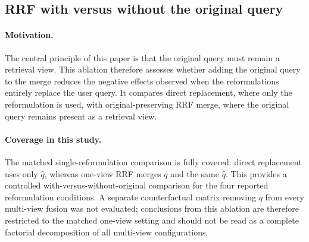 \documentclass[a4paper,fleqn]{cas-dc}
\begin{document}
\subsection{RRF with versus without the original query}
\label{sec:ablation-original}
\paragraph{Motivation.}
The central principle of this paper is that the
original query must remain a retrieval view. This
ablation therefore assesses whether adding the original query
to the merge reduces the negative effects observed
when the reformulations entirely replace the
user query. It compares direct replacement,
where only the reformulation is used, with
original-preserving RRF merge, where the original query
remains present as a retrieval view.
\paragraph{Coverage in this study.}
The matched single-reformulation comparison is fully covered:
direct replacement uses only $\hat{q}$, whereas one-view RRF merges
$q$ and the same $\hat{q}$. This provides a controlled
with-versus-without-original comparison for the four reported
reformulation conditions. A separate counterfactual matrix removing
$q$ from every multi-view fusion was not evaluated; conclusions from
this ablation are therefore restricted to the matched one-view setting
and should not be read as a complete factorial decomposition of all
multi-view configurations.
\end{document}

